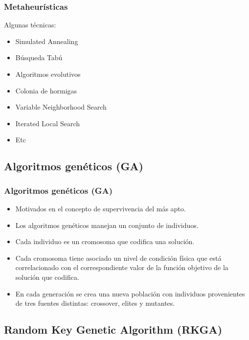 \documentclass{beamer}
\begin{document}

\begin{frame}
\frametitle{Metaheurísticas}

Algunas técnicas:

\begin{itemize}
    \item Simulated Annealing
    \item Búsqueda Tabú
    \item Algoritmos evolutivos
    \item Colonia de hormigas
    \item Variable Neighborhood Search
    \item Iterated Local Search
    \item Etc
\end{itemize}

\end{frame}


\subsection{Algoritmos genéticos (GA)}

\begin{frame}
\frametitle{Algoritmos genéticos (GA)}

\begin{itemize}
    \item Motivados en el concepto de supervivencia del más apto.
    \pause
    \item Los algoritmos genéticos manejan un conjunto de individuos.
    \pause
    \item Cada individuo es un cromosoma que codifica una solución.
    \pause
    \item Cada cromosoma tiene asociado un nivel de condición física que está correlacionado con el correspondiente valor de la función objetivo de la solución que codifica.
    \pause
    \item En cada generación se crea una nueva población con individuos provenientes de tres fuentes distintas: crossover, elites y mutantes.
\end{itemize}

\end{frame}


\subsection{Random Key Genetic Algorithm (RKGA)}
\end{document}
